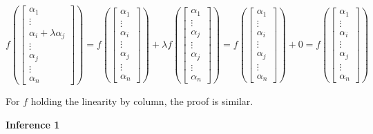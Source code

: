 \documentclass{article}
\begin{document}
\begin{equation}
f(
\begin{bmatrix}
    \alpha_1 \\
    \vdots \\
    \alpha_i + \lambda\alpha_j \\
    \vdots \\
    \alpha_j \\
    \vdots \\
    \alpha_n
\end{bmatrix}) = 
f(\begin{bmatrix}
    \alpha_1 \\
    \vdots \\
    \alpha_i \\
    \vdots \\
    \alpha_j \\
    \vdots \\
    \alpha_n
\end{bmatrix}) +
\lambda f(\begin{bmatrix}
    \alpha_1 \\
    \vdots \\
    \alpha_j \\
    \vdots \\
    \alpha_j \\
    \vdots \\
    \alpha_n
\end{bmatrix}) =
f(\begin{bmatrix}
    \alpha_1 \\
    \vdots \\
    \alpha_i \\
    \vdots \\
    \alpha_j \\
    \vdots \\
    \alpha_n
\end{bmatrix}) + 0 =
f(\begin{bmatrix}
    \alpha_1 \\
    \vdots \\
    \alpha_i \\
    \vdots \\
    \alpha_j \\
    \vdots \\
    \alpha_n
\end{bmatrix})
\end{equation}

For \(f\) holding the linearity by column, the proof is similar.

\vspace{2mm}
\textbf{Inference 1}
\end{document}
